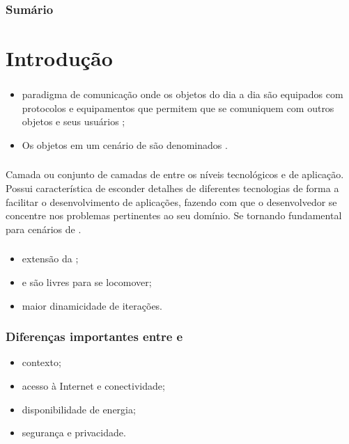 \documentclass[aspectratio=169]{beamer}
\begin{document}
\frame{\titlepage}

\begin{frame}
	\frametitle{Sumário}
	\tableofcontents
\end{frame}


\section{Introdução}


\begin{frame}
	\frametitle{\iot}
	\begin{itemize}
		\item paradigma de comunicação onde os objetos do dia a dia são equipados com protocolos e equipamentos que permitem que se comuniquem com outros objetos e seus usuários \cite{atzori:iera:morabito:2010};

		\item Os objetos em um cenário de \iot são denominados \smartobjs.
	\end{itemize}
\end{frame}

\begin{frame}
	\frametitle{\Middleware}
	Camada ou conjunto de camadas de \software entre os níveis tecnológicos e de aplicação.
	Possui característica de esconder detalhes de diferentes tecnologias de forma a facilitar o desenvolvimento de aplicações, fazendo com que o desenvolvedor se concentre nos problemas pertinentes ao seu domínio.
	Se tornando fundamental para cenários de \iot \cite{atzori:iera:morabito:2010}.
\end{frame}

\begin{frame}
	\frametitle{\iomt}
	\begin{itemize}
		\item extensão da \iot;
			
		\item \smartobjs e \textbf{\gateways} são livres para se locomover;

		\item maior dinamicidade de iterações.
	\end{itemize}
\end{frame}

\begin{frame}
	\frametitle{Diferenças importantes entre \iot e \iomt \cite{nahrstedt:et-al:2016}}
	\begin{itemize}

		\item {contexto};

		\item {acesso à Internet e conectividade};

		\item {disponibilidade de energia};

		\item {segurança e privacidade}.

	\end{itemize}
\end{frame}
\end{document}
